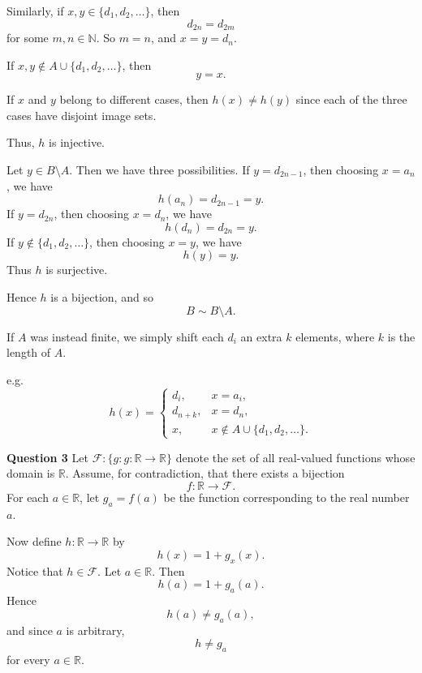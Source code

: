 \documentclass[12pt]{article}
\begin{document}
\begin{enumerate}
          Similarly, if $x, y \in \{d_1, d_2, \ldots \}$, then
          \[
              d_{2n} = d_{2m}
          \]
          for some $m, n \in \mathbb{N}$.
          So $m = n$, and $x = y = d_n$.

          If $x, y \notin A \cup \{d_1, d_2, \ldots \}$, then
          \[
              y = x.
          \]

          If \(x\) and \(y\) belong to different cases, then \(h(x)\neq h(y)\) since each
          of the three cases have disjoint image sets.

          Thus, $h$ is injective.


          Let $y \in B \setminus A$.
          Then we have three possibilities.
          If $y = d_{2n-1}$, then choosing $x = a_n$, we have
          \[
              h(a_n) = d_{2n-1} = y.
          \]
          If $y = d_{2n}$, then choosing $x = d_n$, we have
          \[
              h(d_n) = d_{2n} = y.
          \]
          If $y \notin \{d_1, d_2, \ldots\}$, then choosing $x = y$, we have
          \[
              h(y) = y.
          \]
          Thus $h$ is surjective.

          Hence $h$ is a bijection, and so
          \[
              B \sim B \setminus A.
          \]

          If $A$ was instead finite, we simply shift each $d_i$ an extra $k$ elements, where $k$ is the length of $A$.

          e.g.
          \[
              h(x)=
              \begin{cases}
                  d_{i},   & x=a_i,                           \\
                  d_{n+k}, & x=d_n,                           \\
                  x,       & x\notin A\cup\{d_1,d_2,\ldots\}.
              \end{cases}
          \]
\end{enumerate}

\noindent{} \textbf{Question 3}
Let $\mathcal{F} : \{g: g : \mathbb{R} \to \mathbb{R}\}$
denote the set of all real-valued functions whose domain is $\mathbb{R}$.
Assume, for contradiction, that there exists a bijection
\[
    f: \mathbb{R} \to \mathcal{F}.
\]
For each $a \in \mathbb{R}$, let $g_a = f(a)$ be the function corresponding to the real number $a$.

Now define $h: \mathbb{R} \to \mathbb{R}$ by
\[
    h(x) = 1 + g_x(x).
\]
Notice that $h \in \mathcal{F}$.
Let $a \in \mathbb{R}$. Then
\[
    h(a) = 1 + g_a(a).
\]
Hence
\[
    h(a) \neq g_a(a),
\]
and since $a$ is arbitrary,
\[
    h \neq g_a
\]
for every $a \in \mathbb{R}$.
\end{document}
